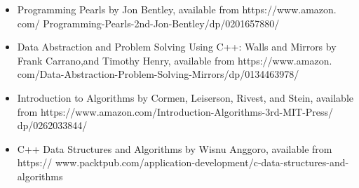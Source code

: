 \begin{itemize}
	\item Programming Pearls by Jon Bentley, available from  https:/​/​www.​amazon.​com/	Programming-​Pearls-​2nd-​Jon-​Bentley/​dp/​0201657880/​
	\item Data Abstraction and Problem Solving Using C++: Walls and Mirrors by Frank Carrano,and Timothy Henry, available from  https:/​/​www.​amazon.​com/​Data-Abstraction-​Problem-​Solving-​Mirrors/​dp/​0134463978/​
	\item Introduction to Algorithms by Cormen, Leiserson, Rivest, and Stein, available
	from https:/​/​www.​amazon.​com/​Introduction-​Algorithms-​3rd-​MIT-​Press/​dp/0262033844/​
	\item C++ Data Structures and Algorithms by Wisnu Anggoro, available from  https:/​/
	www.​packtpub.​com/​application-​development/​c-​data-​structures-​and-algorithms
\end{itemize}

\newpage







